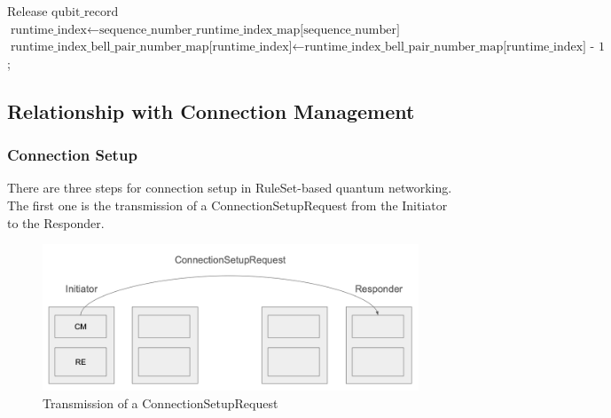           \begin{algorithm}[H]    
            \begin{minipage}{0.8\linewidth}               
            \begin{algorithmic}[1]
                  \State Release $\text{qubit\_record}$ 
                  \State $\text{runtime\_index} \gets \text{sequence\_number\_runtime\_index\_map[sequence\_number]}$
                  \State $\text{runtime\_index\_bell\_pair\_number\_map[runtime\_index]} \gets \text{runtime\_index\_bell\_pair\_number\_map[runtime\_index] - 1}$;
                \EndIf
              \EndFor
            \EndIf
          \EndIf
      \EndFor
    \EndFor
  \end{algorithmic}
\end{minipage}
\end{algorithm}


\subsection{Relationship with Connection Management}
\subsubsection{Connection Setup}

There are three steps for connection setup in RuleSet-based quantum networking. 
The first one is the transmission of a ConnectionSetupRequest from the Initiator to the Responder.
\begin{figure}[H]
  \centerline{\includegraphics[width=\columnwidth]{images/connection_setup_request.png}}
  \caption{Transmission of a ConnectionSetupRequest}
\end{figure}

